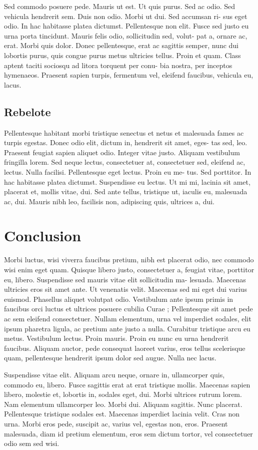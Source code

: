 \documentclass[12pt,twocolumn,twoside]{article}
\begin{document}
Sed commodo posuere pede. Mauris ut est. Ut quis purus. Sed ac odio.
Sed vehicula hendrerit sem. Duis non odio. Morbi ut dui. Sed accumsan ri-
sus eget odio. In hac habitasse platea dictumst. Pellentesque non elit. Fusce
sed justo eu urna porta tincidunt. Mauris felis odio, sollicitudin sed, volut-
pat a, ornare ac, erat. Morbi quis dolor. Donec pellentesque, erat ac sagittis
semper, nunc dui lobortis purus, quis congue purus metus ultricies tellus.
Proin et quam. Class aptent taciti sociosqu ad litora torquent per conu-
bia nostra, per inceptos hymenaeos. Praesent sapien turpis, fermentum vel,
eleifend faucibus, vehicula eu, lacus.

\subsection{Rebelote}
Pellentesque habitant morbi tristique senectus et netus et malesuada
fames ac turpis egestas. Donec odio elit, dictum in, hendrerit sit amet, eges-
tas sed, leo. Praesent feugiat sapien aliquet odio. Integer vitae justo. Aliquam
vestibulum fringilla lorem. Sed neque lectus, consectetuer at, consectetuer
sed, eleifend ac, lectus. Nulla facilisi. Pellentesque eget lectus. Proin eu me-
tus. Sed porttitor. In hac habitasse platea dictumst. Suspendisse eu lectus.
Ut mi mi, lacinia sit amet, placerat et, mollis vitae, dui. Sed ante tellus,
tristique ut, iaculis eu, malesuada ac, dui. Mauris nibh leo, facilisis non,
adipiscing quis, ultrices a, dui.

\section*{Conclusion}
Morbi luctus, wisi viverra faucibus pretium, nibh est placerat odio, nec
commodo wisi enim eget quam. Quisque libero justo, consectetuer a, feugiat
vitae, porttitor eu, libero. Suspendisse sed mauris vitae elit sollicitudin ma-
lesuada. Maecenas ultricies eros sit amet ante. Ut venenatis velit. Maecenas
sed mi eget dui varius euismod. Phasellus aliquet volutpat odio. Vestibulum
ante ipsum primis in faucibus orci luctus et ultrices posuere cubilia Curae ;
Pellentesque sit amet pede ac sem eleifend consectetuer. Nullam elementum,
urna vel imperdiet sodales, elit ipsum pharetra ligula, ac pretium ante justo
a nulla. Curabitur tristique arcu eu metus. Vestibulum lectus. Proin mauris.
Proin eu nunc eu urna hendrerit faucibus. Aliquam auctor, pede consequat
laoreet varius, eros tellus scelerisque quam, pellentesque hendrerit ipsum
dolor sed augue. Nulla nec lacus.

Suspendisse vitae elit. Aliquam arcu neque, ornare in, ullamcorper quis,
commodo eu, libero. Fusce sagittis erat at erat tristique mollis. Maecenas
sapien libero, molestie et, lobortis in, sodales eget, dui. Morbi ultrices rutrum
lorem. Nam elementum ullamcorper leo. Morbi dui. Aliquam sagittis. Nunc
placerat. Pellentesque tristique sodales est. Maecenas imperdiet lacinia velit.
Cras non urna. Morbi eros pede, suscipit ac, varius vel, egestas non, eros.
Praesent malesuada, diam id pretium elementum, eros sem dictum tortor,
vel consectetuer odio sem sed wisi.
\tableofcontents
\end{document}
